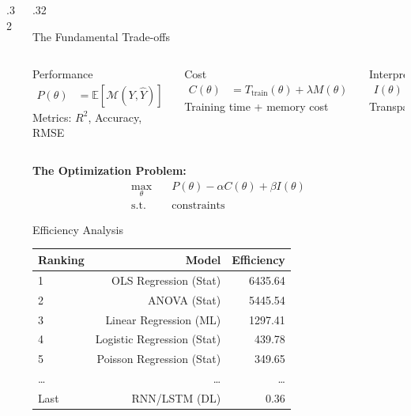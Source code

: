 \documentclass[final]{beamer}
\begin{document}
\begin{frame}[t]
\begin{columns}[t]
\begin{column}{.32\linewidth}
\end{column}

\begin{column}{.32\linewidth}

\begin{alertblock}{The Fundamental Trade-offs}
\begin{columns}[t]
\begin{block}{\textcolor{mlcolor}{Performance}}
\begin{align*}
P(\theta) &= \mathbb{E}[\mathcal{M}(Y, \hat{Y})]
\end{align*}
Metrics: $R^2$, Accuracy, RMSE
\end{block}

\begin{block}{\textcolor{statcolor}{Cost}}
\begin{align*}
C(\theta) &= T_{\text{train}}(\theta) + \lambda M(\theta)
\end{align*}
Training time + memory cost
\end{block}

\begin{block}{\textcolor{accentcolor}{Interpretability}}
\begin{align*}
I(\theta) &= \text{Explainability Score} \in [0, 100]
\end{align*}
Transparency and trust
\end{block}
\end{columns}

\vspace{0.3cm}
\textbf{The Optimization Problem:}
\begin{align*}
\max_\theta \quad &P(\theta) - \alpha C(\theta) + \beta I(\theta) \\
\text{s.t. } &\text{constraints}
\end{align*}
\end{alertblock}

\begin{block}{Efficiency Analysis}
\centering
\small
\begin{tabular}{lrr}
\toprule
\textbf{Ranking} & \textbf{Model} & \textbf{Efficiency} \\
\midrule
1 & OLS Regression (Stat) & \textcolor{accentcolor}{6435.64} \\
2 & ANOVA (Stat) & \textcolor{accentcolor}{5445.54} \\
3 & Linear Regression (ML) & 1297.41 \\
4 & Logistic Regression (Stat) & 439.78 \\
5 & Poisson Regression (Stat) & 349.65 \\
\ldots & \ldots & \ldots \\
Last & RNN/LSTM (DL) & 0.36 \\
\bottomrule
\end{tabular}


\end{block}
\end{column}
\end{columns}
\end{frame}
\end{document}
